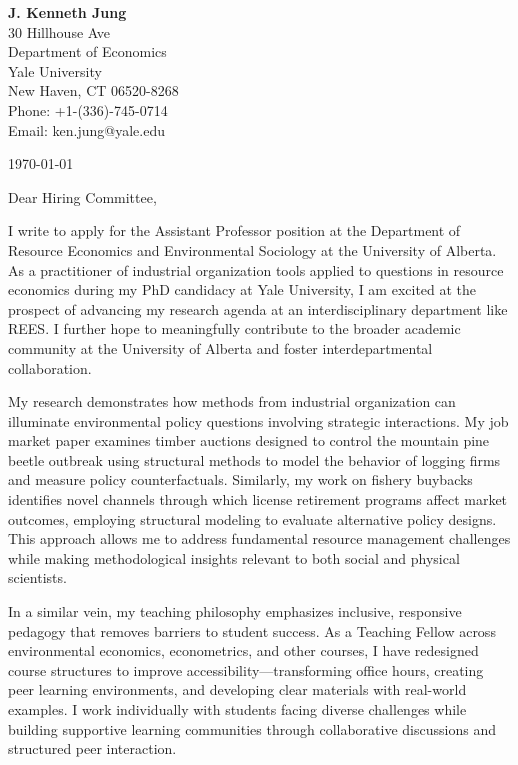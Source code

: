 \documentclass[11pt,letterpaper]{article}
\begin{document}
\begin{flushleft}
\textbf{J. Kenneth Jung}\\
30 Hillhouse Ave\\
Department of Economics\\
Yale University\\
New Haven, CT 06520-8268\\
Phone: +1-(336)-745-0714\\
Email: ken.jung@yale.edu
\end{flushleft}

\vspace{12pt}

\today

\vspace{12pt}

Dear Hiring Committee,

I write to apply for the Assistant Professor position at the Department of Resource Economics and Environmental Sociology at the University of Alberta. As a practitioner of industrial organization tools applied to questions in resource economics during my PhD candidacy at Yale University, I am excited at the prospect of advancing my research agenda at an interdisciplinary department like REES. I further hope to meaningfully contribute to the broader academic community at the University of Alberta and foster interdepartmental collaboration.

My research demonstrates how methods from industrial organization can illuminate environmental policy questions involving strategic interactions. My job market paper examines timber auctions designed to control the mountain pine beetle outbreak using structural methods to model the behavior of logging firms and measure policy counterfactuals. Similarly, my work on fishery buybacks identifies novel channels through which license retirement programs affect market outcomes, employing structural modeling to evaluate alternative policy designs. This approach allows me to address fundamental resource management challenges while making methodological insights relevant to both social and physical scientists.

In a similar vein, my teaching philosophy emphasizes inclusive, responsive pedagogy that removes barriers to student success. As a Teaching Fellow across environmental economics, econometrics, and other courses, I have redesigned course structures to improve accessibility—transforming office hours, creating peer learning environments, and developing clear materials with real-world examples. I work individually with students facing diverse challenges while building supportive learning communities through collaborative discussions and structured peer interaction.
\end{document}
